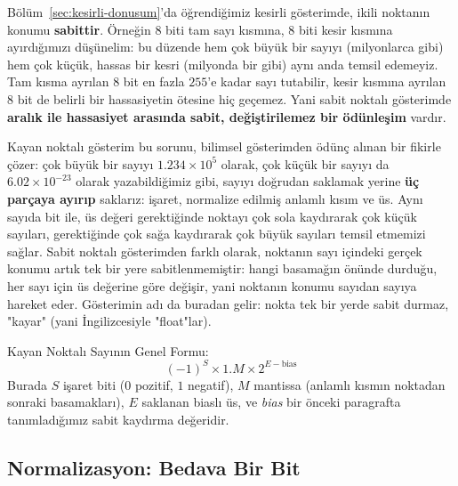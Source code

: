Bölüm~\ref{sec:kesirli-donusum}'da öğrendiğimiz kesirli gösterimde, ikili noktanın konumu
\textbf{sabittir}. Örneğin $8$ biti tam sayı kısmına, $8$ biti kesir kısmına ayırdığımızı
düşünelim: bu düzende hem çok büyük bir sayıyı (milyonlarca gibi) hem çok küçük, hassas bir
kesri (milyonda bir gibi) aynı anda temsil edemeyiz. Tam kısma ayrılan $8$ bit en fazla
$255$'e kadar sayı tutabilir, kesir kısmına ayrılan $8$ bit de belirli bir hassasiyetin
ötesine hiç geçemez. Yani sabit noktalı gösterimde \textbf{aralık ile hassasiyet arasında
sabit, değiştirilemez bir ödünleşim} vardır.

Kayan noktalı gösterim bu sorunu, bilimsel gösterimden ödünç alınan bir fikirle çözer: çok
büyük bir sayıyı $1.234\times10^5$ olarak, çok küçük bir sayıyı da $6.02\times10^{-23}$
olarak yazabildiğimiz gibi, sayıyı doğrudan saklamak yerine \textbf{üç parçaya ayırıp}
saklarız: işaret, normalize edilmiş anlamlı kısım ve üs. Aynı sayıda bit ile, üs değeri
gerektiğinde noktayı çok sola kaydırarak çok küçük sayıları, gerektiğinde çok sağa
kaydırarak çok büyük sayıları temsil etmemizi sağlar. Sabit noktalı gösterimden farklı
olarak, noktanın sayı içindeki gerçek konumu artık tek bir yere sabitlenmemiştir: hangi
basamağın önünde durduğu, her sayı için üs değerine göre değişir, yani noktanın konumu
sayıdan sayıya hareket eder. Gösterimin adı da buradan gelir: nokta tek bir yerde sabit
durmaz, "kayar" (yani İngilizcesiyle "float"lar).

\begin{tanim}{Kayan Noktalı Sayının Genel Formu:}
\[
(-1)^S \times 1.M \times 2^{E-\text{bias}}
\]
Burada $S$ işaret biti ($0$ pozitif, $1$ negatif), $M$ mantissa (anlamlı kısmın noktadan
sonraki basamakları), $E$ saklanan biaslı üs, ve \emph{bias} bir önceki paragrafta
tanımladığımız sabit kaydırma değeridir.
\end{tanim}

\subsection{Normalizasyon: Bedava Bir Bit}
\label{sec:normalizasyon}

